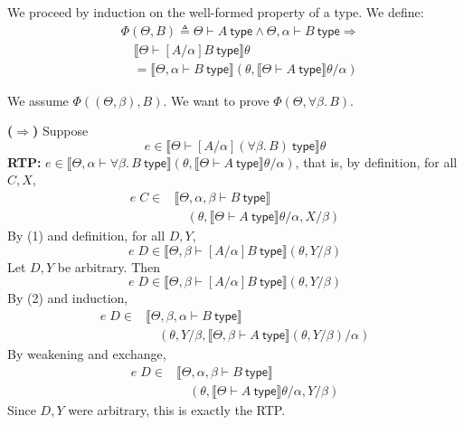 \documentclass[10pt,\jkfside,a4paper]{article}
\begin{document}
\begin{enumerate}
\begin{enumerate}
{            We proceed by induction on the well-formed property of a type. We define: 
            \begin{align*}
                & \Phi(\Theta, B) \triangleq \Theta \vdash A\ \mathsf{type} \wedge \Theta, \alpha \vdash B\ \mathsf{type} \Rightarrow {} \\
                & \quad \llbracket \Theta \vdash [A / \alpha] B\ \mathsf{type} \rrbracket \theta \\
                & \quad = \llbracket \Theta, \alpha \vdash B\ \mathsf{type} \rrbracket (\theta, \llbracket \Theta \vdash A\ \mathsf{type} \rrbracket \theta / \alpha)
            \end{align*}

            We assume $\Phi((\Theta, \beta), B)$. We want to prove $\Phi(\Theta, \forall \beta.\, B)$.

            \textbf{($\Rightarrow$)} Suppose
            \[
                e \in \llbracket \Theta \vdash [A / \alpha](\forall \beta.\, B)\ \mathsf{type} \rrbracket \theta \tag{1}
            \]
            \textbf{RTP:} $e \in \llbracket \Theta, \alpha \vdash \forall \beta.\, B\ \mathsf{type} \rrbracket (\theta, \llbracket \Theta \vdash A\ \mathsf{type} \rrbracket \theta / \alpha)$, that is, by definition, for all $C, X$,
            \begin{align*}
                e\;C \in{} & \llbracket \Theta, \alpha, \beta \vdash B\ \mathsf{type} \rrbracket \\
                & \quad (\theta, \llbracket \Theta \vdash A\ \mathsf{type} \rrbracket \theta / \alpha, X / \beta)
            \end{align*}
            By (1) and definition, for all $D, Y$,
            \[
                e\;D \in \llbracket \Theta, \beta \vdash [A / \alpha] B\ \mathsf{type} \rrbracket (\theta, Y / \beta)
            \]
            Let $D, Y$ be arbitrary. Then
            \[
                e\;D \in \llbracket \Theta, \beta \vdash [A / \alpha] B\ \mathsf{type} \rrbracket (\theta, Y / \beta) \tag{2}
            \]
            By (2) and induction,
            \begin{align*}
                e\;D \in{} & \llbracket \Theta, \beta, \alpha \vdash B\ \mathsf{type} \rrbracket \\
                & \quad (\theta, Y / \beta, \llbracket \Theta, \beta \vdash A\ \mathsf{type} \rrbracket (\theta, Y / \beta) / \alpha)
            \end{align*}
            By weakening and exchange,
            \begin{align*}
                e\;D \in{} & \llbracket \Theta, \alpha, \beta \vdash B\ \mathsf{type} \rrbracket \\
                & \quad (\theta, \llbracket \Theta \vdash A\ \mathsf{type} \rrbracket \theta / \alpha, Y / \beta)
            \end{align*}
            Since $D, Y$ were arbitrary, this is exactly the RTP.
        }


\end{enumerate}
\end{enumerate}
\end{document}
